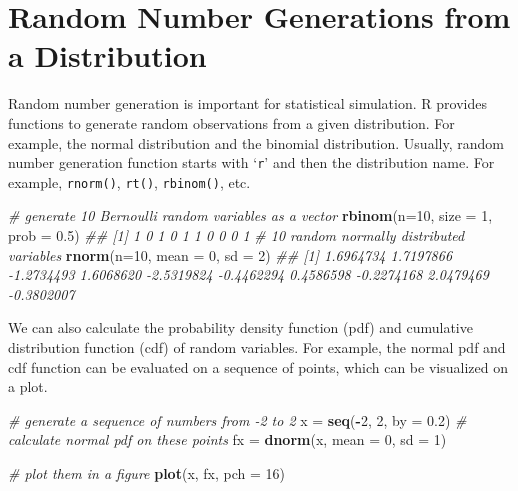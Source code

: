 \documentclass[
]{article}
\newenvironment{Shaded}{\begin{snugshade}}{\end{snugshade}}
\newcommand{\CommentTok}[1]{\textcolor[rgb]{0.56,0.35,0.01}{\textit{#1}}}
\newcommand{\DataTypeTok}[1]{\textcolor[rgb]{0.13,0.29,0.53}{#1}}
\newcommand{\DecValTok}[1]{\textcolor[rgb]{0.00,0.00,0.81}{#1}}
\newcommand{\FloatTok}[1]{\textcolor[rgb]{0.00,0.00,0.81}{#1}}
\newcommand{\KeywordTok}[1]{\textcolor[rgb]{0.13,0.29,0.53}{\textbf{#1}}}
\newcommand{\NormalTok}[1]{#1}
\newcommand{\OperatorTok}[1]{\textcolor[rgb]{0.81,0.36,0.00}{\textbf{#1}}}
\newcommand{\StringTok}[1]{\textcolor[rgb]{0.31,0.60,0.02}{#1}}
\begin{document}
\hypertarget{random-number-generations-from-a-distribution}{%
\section{Random Number Generations from a
Distribution}\label{random-number-generations-from-a-distribution}}

Random number generation is important for statistical simulation. R
provides functions to generate random observations from a given
distribution. For example, the normal distribution and the binomial
distribution. Usually, random number generation function starts with
`\texttt{r}' and then the distribution name. For example,
\texttt{rnorm()}, \texttt{rt()}, \texttt{rbinom()}, etc.

\begin{Shaded}
\begin{Highlighting}[]
    \CommentTok{# generate 10 Bernoulli random variables as a vector}
    \KeywordTok{rbinom}\NormalTok{(}\DataTypeTok{n=}\DecValTok{10}\NormalTok{, }\DataTypeTok{size =} \DecValTok{1}\NormalTok{, }\DataTypeTok{prob =} \FloatTok{0.5}\NormalTok{)}
\CommentTok{##  [1] 1 0 1 0 1 1 0 0 0 1}
    \CommentTok{# 10 random normally distributed variables}
    \KeywordTok{rnorm}\NormalTok{(}\DataTypeTok{n=}\DecValTok{10}\NormalTok{, }\DataTypeTok{mean =} \DecValTok{0}\NormalTok{, }\DataTypeTok{sd =} \DecValTok{2}\NormalTok{)}
\CommentTok{##  [1]  1.6964734  1.7197866 -1.2734493  1.6068620 -2.5319824 -0.4462294  0.4586598 -0.2274168  2.0479469 -0.3802007}
\end{Highlighting}
\end{Shaded}

We can also calculate the probability density function (pdf) and
cumulative distribution function (cdf) of random variables. For example,
the normal pdf and cdf function can be evaluated on a sequence of
points, which can be visualized on a plot.

\begin{Shaded}
\begin{Highlighting}[]
    \CommentTok{# generate a sequence of numbers from -2 to 2}
\NormalTok{    x =}\StringTok{ }\KeywordTok{seq}\NormalTok{(}\OperatorTok{-}\DecValTok{2}\NormalTok{, }\DecValTok{2}\NormalTok{, }\DataTypeTok{by =} \FloatTok{0.2}\NormalTok{)}
    \CommentTok{# calculate normal pdf on these points}
\NormalTok{    fx =}\StringTok{ }\KeywordTok{dnorm}\NormalTok{(x, }\DataTypeTok{mean =} \DecValTok{0}\NormalTok{, }\DataTypeTok{sd =} \DecValTok{1}\NormalTok{)}
    
    \CommentTok{# plot them in a figure}
    \KeywordTok{plot}\NormalTok{(x, fx, }\DataTypeTok{pch =} \DecValTok{16}\NormalTok{)}
\end{Highlighting}
\end{Shaded}
\end{document}
